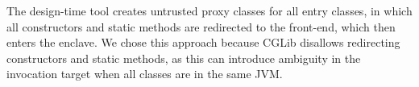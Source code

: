 The \systemname{} design-time tool creates untrusted proxy classes for all entry classes,
in which all constructors and static methods are redirected to
the \systemname{} front-end, which then enters the enclave.
We chose this approach because CGLib disallows redirecting 
constructors and static methods, as this can introduce ambiguity in
the invocation target when all classes are in the same JVM.




